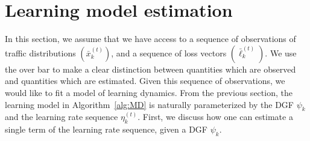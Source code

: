 \documentclass{sig-alternate-ipsn13}
\begin{document}
\section{Learning model estimation}
\label{sec:estimation}
In this section, we assume that we have access to a sequence of observations of traffic distributions $(\bar x^{(t)}_k)$, and a sequence of loss vectors $(\bar \ell^{(t)}_k)$. We use the over bar to make a clear distinction between quantities which are observed and quantities which are estimated. Given this sequence of observations, we would like to fit a model of learning dynamics. From the previous section, the learning model in Algorithm~\ref{alg:MD} is naturally parameterized by the DGF $\psi_k$ and the learning rate sequence $\eta_k^{(t)}$. First, we discuss how one can estimate a single term of the learning rate sequence, given a DGF $\psi_k$.

\end{document}
